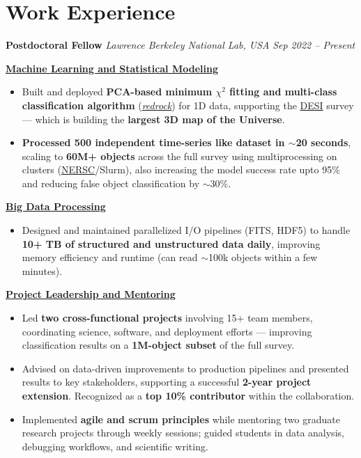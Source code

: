 \documentclass[a4paper,10pt]{article}
\begin{document}
\section*{Work Experience}
\textcolor{sectionblue}{\textbf{Postdoctoral Fellow}} \hfill 
\textcolor{sectionblue}{\textit{Lawrence Berkeley National Lab, USA}} \hfill 
\textcolor{sectionblue}{\textit{Sep 2022 – Present}}
\vspace{1.5mm}
\begin{adjustwidth}{1em}{0pt}

\textbf{\textcolor{sectionblue}{\underline{Machine Learning and Statistical Modeling}}}
\begin{itemize}[leftmargin=*, itemsep=2pt]
    \item Built and deployed \textbf{PCA-based minimum $\chi^2$ fitting and multi-class classification algorithm} (\href{https://github.com/desihub/redrock}{\textit{redrock}}) for 1D data, supporting the \href{https://en.wikipedia.org/wiki/Dark_Energy_Spectroscopic_Instrument}{DESI} survey — which is building the \textbf{largest 3D map of the Universe}.
    \vspace{-0.5mm}
    \item \textbf{Processed 500 independent time-series like dataset in $\sim$20 seconds}, scaling to \textbf{60M+ objects} across the full survey using multiprocessing on clusters (\href{https://www.nersc.gov/}{NERSC}/Slurm), also increasing the model success rate upto 95\% and reducing false object classification by $\sim$30\%.
\end{itemize}
\vspace{-1pt}
\textcolor{sectionblue}{\textbf{\underline{Big Data Processing}}}
\begin{itemize}[leftmargin=*, itemsep=2pt]
    \item Designed and maintained parallelized I/O pipelines (FITS, HDF5) to handle \textbf{10+ TB of structured and unstructured data daily}, improving memory efficiency and runtime (can read $\sim$100k objects within a few minutes).
\end{itemize}
\vspace{-0.5pt}
\textcolor{sectionblue}{\textbf{\underline{Project Leadership and Mentoring}}}
\begin{itemize}[leftmargin=*, itemsep=2pt]
    \item Led \textbf{two cross-functional projects} involving 15+ team members, coordinating science, software, and deployment efforts — improving classification results on a \textbf{1M-object subset} of the full survey.
     \vspace{-0.5mm}
    \item Advised on data-driven improvements to production pipelines and presented results to key stakeholders, supporting a successful \textbf{2-year project extension}. Recognized as a \textbf{top 10\% contributor} within the collaboration.
    \item Implemented \textbf{agile and scrum principles} while mentoring two graduate research projects through weekly sessions; guided students in data analysis, debugging workflows, and scientific writing.

\end{itemize}
\end{adjustwidth}
\end{document}
